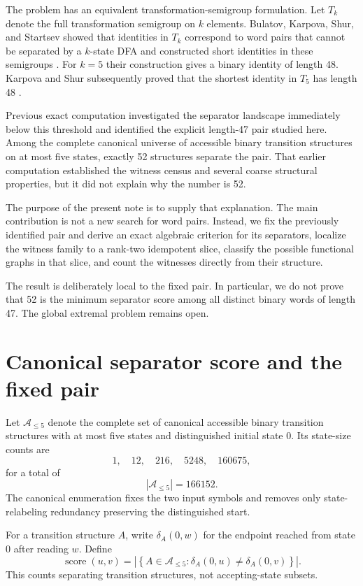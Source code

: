 \documentclass[10pt]{article}
\newcommand{\score}{\operatorname{score}}
\begin{document}
The problem has an equivalent transformation-semigroup formulation. Let $T_k$ denote the full transformation semigroup on $k$ elements. Bulatov, Karpova, Shur, and Startsev showed that identities in $T_k$ correspond to word pairs that cannot be separated by a $k$-state DFA and constructed short identities in these semigroups \cite{BKSS2017}. For $k=5$ their construction gives a binary identity of length 48. Karpova and Shur subsequently proved that the shortest identity in $T_5$ has length 48 \cite{KS2021}.

Previous exact computation investigated the separator landscape immediately below this threshold and identified the explicit length-47 pair studied here. Among the complete canonical universe of accessible binary transition structures on at most five states, exactly 52 structures separate the pair. That earlier computation established the witness census and several coarse structural properties, but it did not explain why the number is 52.

The purpose of the present note is to supply that explanation. The main contribution is not a new search for word pairs. Instead, we fix the previously identified pair and derive an exact algebraic criterion for its separators, localize the witness family to a rank-two idempotent slice, classify the possible functional graphs in that slice, and count the witnesses directly from their structure.

The result is deliberately local to the fixed pair. In particular, we do not prove that 52 is the minimum separator score among all distinct binary words of length 47. The global extremal problem remains open.

\section{Canonical separator score and the fixed pair}

Let $\mathcal A_{\leq5}$ denote the complete set of canonical accessible binary transition structures with at most five states and distinguished initial state $0$. Its state-size counts are
\[
1,\quad 12,\quad 216,\quad 5248,\quad 160675,
\]
for a total of
\[
|\mathcal A_{\leq5}|=166152.
\]
The canonical enumeration fixes the two input symbols and removes only state-relabeling redundancy preserving the distinguished start.

For a transition structure $A$, write $\delta_A(0,w)$ for the endpoint reached from state $0$ after reading $w$. Define
\[
\score(u,v)
=
\left|
\left\{
A\in\mathcal A_{\leq5}:
\delta_A(0,u)\neq\delta_A(0,v)
\right\}
\right|.
\]
This counts separating transition structures, not accepting-state subsets.
\end{document}
